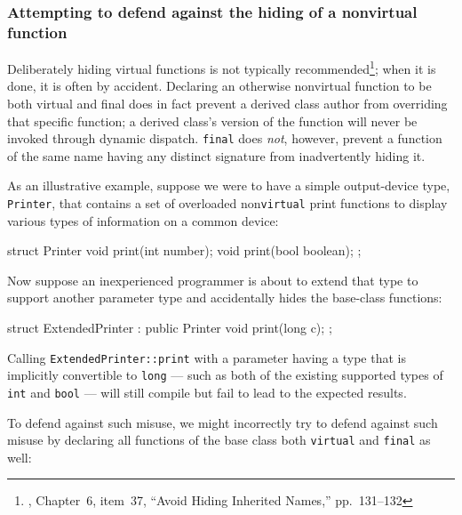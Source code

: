 {\subsubsection[Attempting to defend against the hiding of a non\lstinline!virtual! function]{Attempting to defend against the hiding of a non{\SubsubsecCode virtual} function}\label{attempting-to-defend-against-the-hiding-of-a-nonvirtual-function}

Deliberately hiding virtual functions is not typically
recommended{\cprotect\footnote{\cite{meyers96}, Chapter~6, item~37, ``Avoid
  Hiding Inherited Names,'' pp.~131--132}}; when it is done, it is often
by accident. Declaring an otherwise nonvirtual function to be both
virtual and final does in fact prevent a derived class author from
overriding that specific function; a derived class's version of the
function will never be invoked through dynamic dispatch. \texttt{final}
does \emph{not}, however, prevent a function of the same name having any
distinct signature from inadvertently hiding it.

As an illustrative example, suppose we were to have a simple
output-device type, \texttt{Printer}, that contains a set of overloaded
non\texttt{virtual} print functions to display various types of
information on a common device:

\begin{emcppslisting}
struct Printer
{
    void print(int number);
    void print(bool boolean);
};
\end{emcppslisting}
    

\noindent Now suppose an inexperienced programmer is about to extend that type to
support another parameter type and accidentally hides the base-class
functions:

\begin{emcppslisting}
struct ExtendedPrinter : public Printer
{
    void print(long c);
};
\end{emcppslisting}
    

\noindent Calling \lstinline!ExtendedPrinter::print! with a parameter having a type
that is implicitly convertible to \lstinline!long! --- such as both of the
existing supported types of \lstinline!int! and \lstinline!bool! --- will
still compile but fail to lead to the expected results.

To defend against such misuse, we might incorrectly try to defend
against such misuse by declaring all functions of the base class both
\lstinline!virtual! and \lstinline!final! as well:

}
